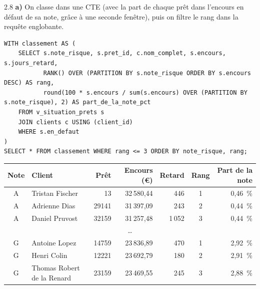 \begin{correction}{2.8}
\textbf{a)} On classe dans une CTE (avec la part de chaque prêt dans l'encours en défaut de sa note,
grâce à une seconde fenêtre), puis on filtre le rang dans la requête englobante.
\begin{lstlisting}[style=long]
WITH classement AS (
    SELECT s.note_risque, s.pret_id, c.nom_complet, s.encours, s.jours_retard,
           RANK() OVER (PARTITION BY s.note_risque ORDER BY s.encours DESC) AS rang,
           round(100 * s.encours / sum(s.encours) OVER (PARTITION BY s.note_risque), 2) AS part_de_la_note_pct
    FROM v_situation_prets s
    JOIN clients c USING (client_id)
    WHERE s.en_defaut
)
SELECT * FROM classement WHERE rang <= 3 ORDER BY note_risque, rang;
\end{lstlisting}

\begin{resultat}
\begin{center}\small
\begin{tabular}{@{}clrrrcr@{}}
\toprule
Note & Client & Prêt & Encours (€) & Retard & Rang & Part de la note \\
\midrule
A & Tristan Fischer & 13 & 32\,580,44 & 446 & 1 & 0,46~\% \\
A & Adrienne Dias & 29141 & 31\,397,09 & 243 & 2 & 0,44~\% \\
A & Daniel Pruvost & 32159 & 31\,257,48 & 1\,052 & 3 & 0,44~\% \\
\multicolumn{7}{c}{\dots} \\
G & Antoine Lopez & 14759 & 23\,836,89 & 470 & 1 & 2,92~\% \\
G & Henri Colin & 12221 & 23\,692,79 & 180 & 2 & 2,91~\% \\
G & Thomas Robert de la Renard & 23159 & 23\,469,55 & 245 & 3 & 2,88~\% \\
\bottomrule
\end{tabular}
\end{center}
\end{resultat}


\end{correction}
